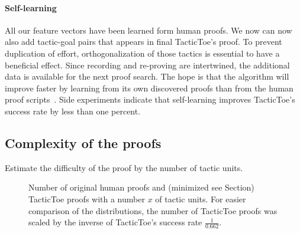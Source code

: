 \documentclass[runningheads,a4paper,draft]{svjour3}
\def\tactictoe{\textsf{TacticToe}\xspace}
\begin{document}
\paragraph{Self-learning}
All our feature vectors have been learned form human proofs. We now can now
also add tactic-goal pairs that appears in final \tactictoe's proof. To prevent
duplication of effort, orthogonalization of those
tactics is essential to have a beneficial effect.
Since recording and re-proving are intertwined, the additional data is
available for the next proof search.
The hope is that the algorithm will improve faster by learning from its own
discovered proofs than from the human proof
scripts~\cite{DBLP:conf/cade/Urban07}. Side experiments indicate that
self-learning improves \tactictoe's success rate by less than one percent.



\subsection{Complexity of the proofs}


Estimate the difficulty of the proof by the number of tactic units.


\begin{figure}[h]
\centering
{}
\caption{Number of original human proofs and (minimized see Section) \tactictoe 
proofs with 
a number $x$ of tactic
units. For easier comparison of the distributions, the number of \tactictoe
proofs was
scaled by the inverse of \tactictoe's success rate $\frac{1}{0.662}$.}
\end{figure}
\end{document}
